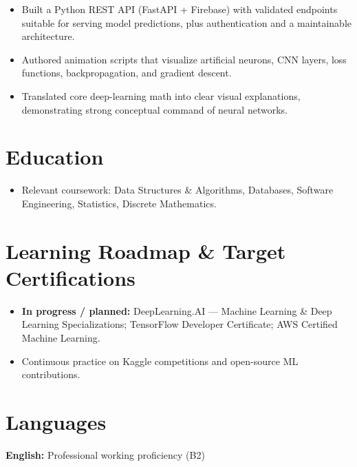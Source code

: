 \documentclass[10pt]{article}
\begin{document}
\begin{itemize}
  \item Built a Python REST API (FastAPI + Firebase) with validated endpoints suitable for serving model predictions, plus authentication and a maintainable architecture.
\end{itemize}

\begin{itemize}
  \item Authored animation scripts that visualize artificial neurons, CNN layers, loss functions, backpropagation, and gradient descent.
  \item Translated core deep-learning math into clear visual explanations, demonstrating strong conceptual command of neural networks.
\end{itemize}

\section{Education}
\begin{itemize}
  \item Relevant coursework: Data Structures \& Algorithms, Databases, Software Engineering, Statistics, Discrete Mathematics.
\end{itemize}

\section{Learning Roadmap \& Target Certifications}
\begin{itemize}
  \item \textbf{In progress / planned:} DeepLearning.AI — Machine Learning \& Deep Learning Specializations; TensorFlow Developer Certificate; AWS Certified Machine Learning.
  \item Continuous practice on Kaggle competitions and open-source ML contributions.
\end{itemize}

\section{Languages}
 \quad\textbullet\quad \textbf{English:} Professional working proficiency (B2)
\end{document}
